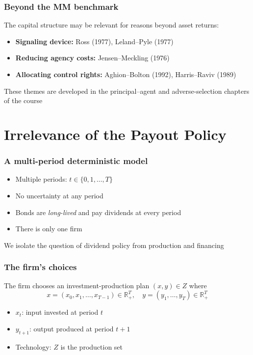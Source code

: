 \documentclass[blue]{beamer}
\def\R{\mathbb{R}}
\theoremstyle{definition}
\theoremstyle{example}
\begin{document}
\begin{frame}\frametitle{Beyond the MM benchmark}
The capital structure may be relevant for reasons beyond asset returns:
\bigskip

\begin{itemize}
\item \textbf{Signaling device:} Ross (1977), Leland--Pyle (1977)
\item \textbf{Reducing agency costs:} Jensen--Meckling (1976)
\item \textbf{Allocating control rights:} Aghion--Bolton (1992), Harris--Raviv (1989)
\end{itemize}
\bigskip

These themes are developed in the principal--agent and adverse-selection chapters of the course
\end{frame}

\section{Irrelevance of the Payout Policy}

\begin{frame}\frametitle{A multi-period deterministic model}
\begin{itemize}
\item Multiple periods: $t \in \{0, 1, \ldots, T\}$
\item No uncertainty at any period
\item Bonds are \emph{long-lived} and pay dividends at every period
\item There is only one firm
\end{itemize}
\bigskip

We isolate the question of dividend policy from production and financing
\end{frame}

\begin{frame}\frametitle{The firm's choices}
The firm chooses an investment-production plan $(x, y) \in Z$ where
\begin{equation*}
x = (x_0, x_1, \ldots, x_{T-1}) \in \R_+^T, \quad
y = (y_1, \ldots, y_T) \in \R_+^T
\end{equation*}
\bigskip

\begin{itemize}
\item $x_t$: input invested at period $t$
\item $y_{t+1}$: output produced at period $t+1$
\item Technology: $Z$ is the production set
\end{itemize}
\end{frame}
\end{document}
